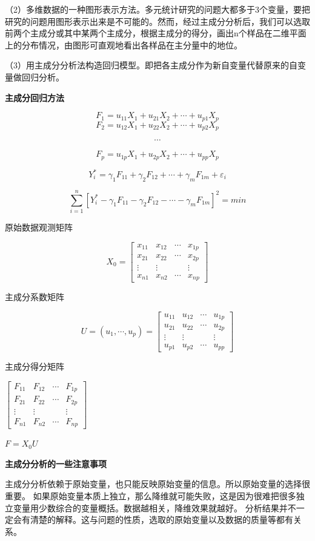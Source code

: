 \documentclass[]{ctexbook}
\begin{document}
（2）多维数据的一种图形表示方法。多元统计研究的问题大都多于3个变量，要把研究的问题用图形表示出来是不可能的。然而，经过主成分分析后，我们可以选取前两个主成分或其中某两个主成分，根据主成分的得分，画出n个样品在二维平面上的分布情况，由图形可直观地看出各样品在主分量中的地位。

（3）用主成分分析法构造回归模型。即把各主成分作为新自变量代替原来的自变量做回归分析。

\textbf{主成分回归方法}

\[F_1=u_{11}X_1+u_{21}X_2+\cdots+u_{p1}X_p\]
\[F_2=u_{12}X_1+u_{22}X_2+\cdots+u_{p2}X_p\]

\[\cdots\]

\[F_p=u_{1p}X_1+u_{2p}X_2+\cdots+u_{pp}X_p\]

\[Y_i^*=\gamma_1F_{11}+\gamma_2F_{12}+\cdots+\gamma_mF_{1m}+\varepsilon_i\]

\[\sum_{i=1}^n[Y_i^*-\gamma_1F_{11}-\gamma_2F_{12}-\cdots-\gamma_mF_{1m}]^2=min\]

原始数据观测矩阵

\[X_0=\begin {bmatrix} x_{11} & x_{12} & \cdots & x_{1p} \\ x_{21} & x_{22} & \cdots & x_{2p} \\ \vdots & \vdots & & \vdots \\ x_{n1} & x_{n2} & \cdots & x_{np} \end {bmatrix}\]

主成分系数矩阵

\[U=(u_1,\cdots,u_p)=\begin {bmatrix} u_{11} & u_{12} & \cdots & u_{1p} \\ u_{21} & u_{22} & \cdots & u_{2p} \\ \vdots & \vdots & & \vdots \\ u_{p1} & u_{p2} & \cdots & u_{pp} \end {bmatrix}\]

主成分得分矩阵

\(\begin {bmatrix} F_{11} & F_{12} & \cdots & F_{1p} \\ F_{21} & F_{22} & \cdots & F_{2p} \\ \vdots & \vdots & & \vdots \\ F_{n1} & F_{n2} & \cdots & F_{np} \end {bmatrix}\)

\(F=X_0U\)

\textbf{主成分分析的一些注意事项}

主成分分析依赖于原始变量，也只能反映原始变量的信息。所以原始变量的选择很重要。
如果原始变量本质上独立，那么降维就可能失败，这是因为很难把很多独立变量用少数综合的变量概括。数据越相关，降维效果就越好。
分析结果并不一定会有清楚的解释。这与问题的性质，选取的原始变量以及数据的质量等都有关系。
\end{document}
